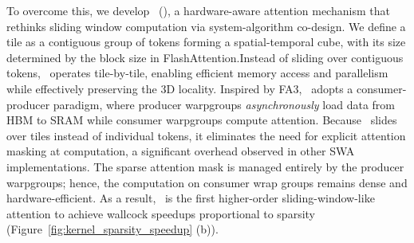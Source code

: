 To overcome this, we develop \methodname~(\methodnameshort), a hardware-aware attention mechanism that rethinks sliding window computation via system-algorithm co-design. We define a tile as a contiguous group of tokens forming a spatial-temporal cube, with its size determined by the block size in FlashAttention.Instead of sliding over contiguous tokens, \methodnameshort~operates tile-by-tile, enabling efficient memory access and parallelism while effectively preserving the 3D locality.
Inspired by FA3, \methodnameshort~adopts a consumer-producer paradigm, where producer warpgroups \emph{asynchronously} load data from HBM to SRAM while consumer warpgroups compute attention. 
Because \methodnameshort~slides over tiles instead of individual tokens, it eliminates the need for explicit attention masking at computation, a significant overhead observed in other SWA implementations.
The sparse attention mask is managed entirely by the producer warpgroups; hence, the computation on consumer wrap groups remains dense and hardware-efficient.
As a result, \methodnameshort~is the first higher-order sliding-window-like attention to achieve wallcock speedups proportional to sparsity (Figure~\ref{fig:kernel_sparsity_speedup} (b)). 

